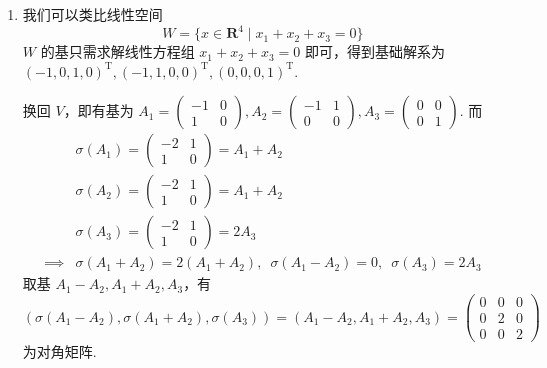 \begin{enumerate}
    \item 我们可以类比线性空间
          \[ W = \{ x \in \mathbf{R}^4 \mid x_1 + x_2 + x_3 = 0 \} \]
          $ W $ 的基只需求解线性方程组 $ x_1 + x_2 + x_3 = 0 $ 即可，得到基础解系为 $ (-1, 0, 1, 0)^{\mathrm{T}},\allowbreak (-1, 1, 0, 0)^{\mathrm{T}},\allowbreak (0, 0, 0, 1)^{\mathrm{T}} $.

          换回 $ V $，即有基为 $ A_1 = \begin{pmatrix} -1 & 0 \\ 1 & 0 \end{pmatrix}, A_2 = \begin{pmatrix} -1 & 1 \\ 0 & 0 \end{pmatrix}, A_3 = \begin{pmatrix} 0 & 0 \\ 0 & 1 \end{pmatrix} $. 而
          \begin{align*}
                         & \sigma(A_1) = \begin{pmatrix} -2 & 1 \\ 1 & 0 \end{pmatrix} = A_1 + A_2                      \\
                         & \sigma(A_2) = \begin{pmatrix} -2 & 1 \\ 1 & 0 \end{pmatrix} = A_1 + A_2                      \\
                         & \sigma(A_3) = \begin{pmatrix} -2 & 1 \\ 1 & 0 \end{pmatrix} = 2 A_3                          \\
              \implies{} & \sigma(A_1 + A_2) = 2(A_1 + A_2),\enspace \sigma(A_1 - A_2) = 0,\enspace \sigma(A_3) = 2 A_3
          \end{align*}
          取基 $ A_1 - A_2, A_1 + A_2, A_3 $，有
          \[ (\sigma(A_1 - A_2), \sigma(A_1 + A_2), \sigma(A_3)) = (A_1 - A_2, A_1 + A_2, A_3) = \begin{pmatrix}
                  0 & 0 & 0 \\
                  0 & 2 & 0 \\
                  0 & 0 & 2
              \end{pmatrix} \]
          为对角矩阵.


\end{enumerate}
